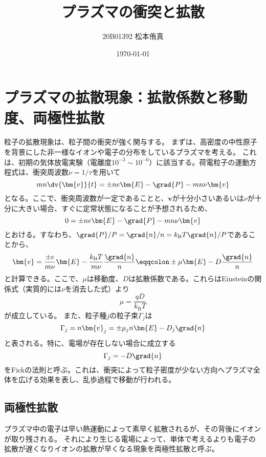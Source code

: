 
\title{プラズマの衝突と拡散}
\author{20B01392 松本侑真}
\date{\today}

\maketitle
\tableofcontents
\newpage
\section{プラズマの拡散現象：拡散係数と移動度、両極性拡散}
粒子の拡散現象は、粒子間の衝突が強く関与する。
まずは、高密度の中性原子を背景にした非一様なイオンや電子の分布をしているプラズマを考える。
これは、初期の気体放電実験（電離度$10^{-3}\sim{}10^{-6}$）に該当する。荷電粒子の運動方程式は、衝突周波数$\nu = 1/\tau$を用いて
\begin{equation}
	mn\dv{\bm{v}}{t} = \pm{}ne\bm{E} - \grad{P}-mn\nu\bm{v}
\end{equation}
となる。ここで、衝突周波数が一定であることと、$\bm{v}$が十分小さいあるいは$\nu$が十分に大きい場合、すぐに定常状態になることが予想されるため、
\begin{equation}
	0 = \pm{}ne\bm{E} - \grad{P}-mn\nu\bm{v}
\end{equation}
とおける。すなわち、$\grad{P}/P = \grad{n}/n = k_{\text{B}}T\grad{n}/P$であることから、
\begin{equation}
	\bm{v} =\frac{\pm{}e}{m\nu}\bm{E} - \frac{k_{\text{B}}T}{m\nu}\frac{\grad{n}}{n} \eqqcolon \pm\mu\bm{E} - D\frac{\grad{n}}{n}
\end{equation}
と計算できる。ここで、$\mu$は移動度、$D$は拡散係数である。これらはEinsteinの関係式（実質的には$\nu$を消去した式）より
\begin{equation}
	\mu = \frac{qD}{k_{\text{B}}T}
\end{equation}
が成立している。
また、粒子種$j$の粒子束$\Gamma_j$は
\begin{equation}
	\Gamma_j = n\bm{v}_j = \pm\mu_jn\bm{E} -D_j\grad{n}
\end{equation}
と表される。特に、電場が存在しない場合に成立する
\begin{equation}
	\Gamma_j = -D\grad{n}
\end{equation}
をFickの法則と呼ぶ。これは、衝突によって粒子密度が少ない方向へプラズマ全体を広げる効果を表し、乱歩過程で移動が行われる。
\subsection{両極性拡散}
プラズマ中の電子は早い熱運動によって素早く拡散されるが、その背後にイオンが取り残される。
それにより生じる電場によって、単体で考えるよりも電子の拡散が遅くなりイオンの拡散が早くなる現象を両極性拡散と呼ぶ。

